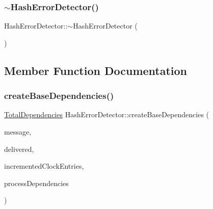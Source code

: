 \mbox{\label{class_hash_error_detector_a187ba4d9f902ecaa0ff8b92ec531d3f4}} 
\subsubsection{\texorpdfstring{$\sim$\+Hash\+Error\+Detector()}{~HashErrorDetector()}}
{\footnotesize\ttfamily Hash\+Error\+Detector\+::$\sim$\+Hash\+Error\+Detector (\begin{DoxyParamCaption}{ }\end{DoxyParamCaption})\hspace{0.3cm}{\ttfamily [virtual]}}



\subsection{Member Function Documentation}
\mbox{\label{class_hash_error_detector_a09b0d73b3a717ddf850fe644848c15c6}} 
\subsubsection{\texorpdfstring{create\+Base\+Dependencies()}{createBaseDependencies()}}
{\footnotesize\ttfamily \hyperlink{class_total_dependencies}{Total\+Dependencies} Hash\+Error\+Detector\+::create\+Base\+Dependencies (\begin{DoxyParamCaption}\item[{const \hyperlink{structures_8h_a7e7bdc1d2fff8a9436f2f352b2711ed6}{message\+Info} \&}]{message,  }\item[{const vector$<$ \hyperlink{structures_8h_a7e7bdc1d2fff8a9436f2f352b2711ed6}{message\+Info} $>$ \&}]{delivered,  }\item[{const vector$<$ unsigned int $>$ \&}]{incremented\+Clock\+Entries,  }\item[{const \hyperlink{class_total_dependencies}{Total\+Dependencies} \&}]{process\+Dependencies }\end{DoxyParamCaption})}

